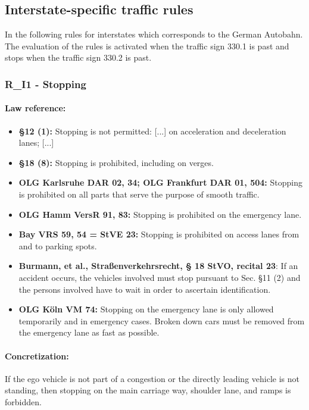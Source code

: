 \subsection{Interstate-specific traffic rules}
In the following rules for interstates which corresponds to the German Autobahn. The evaluation of the rules is activated when the traffic sign 330.1 is past and stops when the traffic sign 330.2 is past.  
\subsubsection{R\_I1 - Stopping}
\paragraph{Law reference:}
\begin{itemize}
	\item \textbf{\stvo \S 12 (1):} Stopping is not permitted: [...] on acceleration and deceleration lanes; [...]
	\item \textbf{\stvo  \S 18 (8):} Stopping is prohibited, including on verges.
	\item \textbf{OLG Karlsruhe DAR 02, 34; OLG Frankfurt DAR 01, 504:} Stopping is prohibited on all parts that serve the purpose of smooth traffic.
	\item \textbf{OLG Hamm VersR 91, 83:} Stopping is prohibited on the emergency lane.
	\item \textbf{Bay VRS 59, 54 = StVE 23:} Stopping is prohibited on access lanes from and to parking spots. 
	\item \textbf{Burmann, et al., Straßenverkehrsrecht, § 18 StVO, recital 23}: If an accident occurs, the vehicles involved must stop pursuant to \stvo Sec. \S 11 (2)  and the persons
	involved have to wait in order to ascertain identification.
	\item \textbf{OLG Köln VM 74:} Stopping on the emergency lane is only allowed temporarily and in emergency cases. Broken down
	cars must be removed from the emergency lane as fast as possible.
\end{itemize}


\paragraph{Concretization:} If the ego vehicle is not part of a congestion or the directly leading vehicle is not standing, then stopping on the main carriage way, shoulder lane, and ramps is forbidden.

